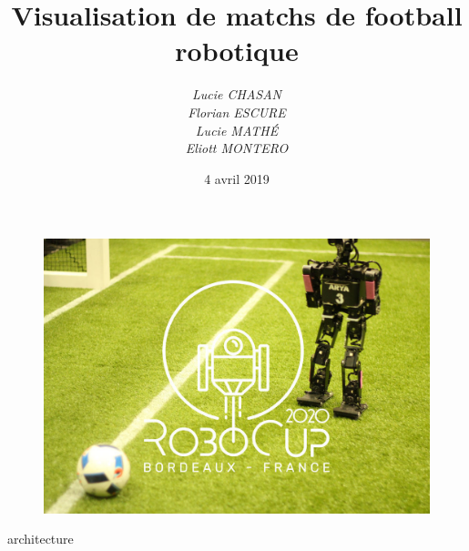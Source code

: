 \documentclass[a4paper,12pt]{report}
\title{Visualisation de matchs de football robotique}
\author{ 
\textit{Lucie CHASAN}\\
\textit{Florian ESCURE}\\
\textit{Lucie MATHÉ}\\
\textit{Eliott MONTERO}\\
}
\date{4 avril 2019}
\begin{document}
\begin{figure}[!b]  
\begin{center}  
\includegraphics[scale=0.25]{images/bx.jpg}  
\end{center}  
\end{figure} 
\maketitle
\tableofcontents





 {architecture}








\printbibliography

\newpage

\end{document}
